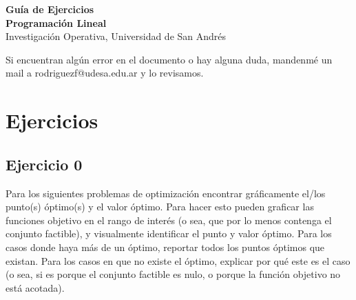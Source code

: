 \documentclass[12pt]{article}
\begin{document}
\begin{center}
    {\LARGE \textbf{Guía de Ejercicios \\Programación Lineal}}\\[0.5em]
    {Investigación Operativa, Universidad de San Andrés}
\end{center}

Si encuentran algún error en el documento o hay alguna duda, mandenmé un mail a rodriguezf@udesa.edu.ar y lo revisamos.

\section{Ejercicios}

\subsection{Ejercicio 0}
Para los siguientes problemas de optimización encontrar gráficamente el/los punto(s) óptimo(s) y el valor óptimo. Para hacer esto pueden graficar las funciones objetivo en el rango de interés (o sea, que por lo menos contenga el conjunto factible), y visualmente identificar el punto y valor óptimo. Para los casos donde haya más de un óptimo, reportar todos los puntos óptimos que existan. Para los casos en que no existe el óptimo, explicar por qué este es el caso (o sea, si es porque el conjunto factible es nulo, o porque la función objetivo no está acotada).
\end{document}
